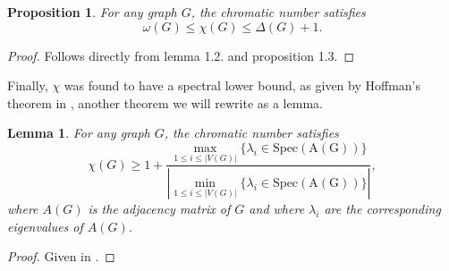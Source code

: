 \documentclass[12pt]{amsart}
\numberwithin{figure}{section}
\theoremstyle{plain}
\newtheorem{proposition}[theorem]{Proposition}
\newtheorem{lemma}[theorem]{Lemma}
\begin{document}
\begin{proposition}
    For any graph $G$, the chromatic number satisfies
    \[\omega(G)\leq\chi(G)\leq\Delta(G)+1.\]
\end{proposition}
\begin{proof}
    Follows directly from lemma 1.2. and proposition 1.3.
\end{proof}
\indent Finally, $\chi$ was found to have a spectral lower bound, as given by Hoffman's theorem in \cite{Hof03}, another theorem we will rewrite as a lemma.
\begin{lemma}
    For any graph $G$, the chromatic number satisfies
    \[\chi(G) \geq 1 + \frac{\operatorname{\max}\limits_{1\leq i \leq |V(G)|}\{\lambda_{i}\in\operatorname{Spec(A(G))}\}}{|\operatorname{\min}\limits_{1\leq i \leq |V(G)|}\{\lambda_{i}\in\operatorname{Spec(A(G))}\}|},\]
    where $A(G)$ is the adjacency matrix of $G$ and where $\lambda_{i}$ are the corresponding eigenvalues of $A(G)$.
\end{lemma}
\begin{proof}
    Given in \cite{Hof03}.
\end{proof}
\end{document}
